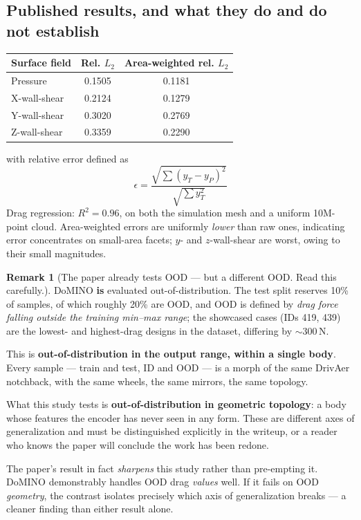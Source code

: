 \documentclass[10pt,a4paper]{article}
\theoremstyle{definition}
\newtheorem{remark}{Remark}[section]
\begin{document}
\subsection{Published results, and what they do and do not establish}
\label{sec:published}

\begin{center}\small
\begin{tabular}{@{}lcc@{}}
\toprule
\textbf{Surface field} & \textbf{Rel. $L_2$} & \textbf{Area-weighted rel. $L_2$} \\
\midrule
Pressure       & 0.1505 & 0.1181 \\
X-wall-shear   & 0.2124 & 0.1279 \\
Y-wall-shear   & 0.3020 & 0.2769 \\
Z-wall-shear   & 0.3359 & 0.2290 \\
\bottomrule
\end{tabular}
\end{center}

with relative error defined as
\begin{equation}
\epsilon = \frac{\sqrt{\sum \left(y_T - y_P\right)^2}}{\sqrt{\sum y_T^2}}
\label{eq:relerr}
\end{equation}
Drag regression: $R^2 = 0.96$, on both the simulation mesh and a uniform 10M-point
cloud. Area-weighted errors are uniformly \emph{lower} than raw ones, indicating
error concentrates on small-area facets; $y$- and $z$-wall-shear are worst, owing to
their small magnitudes.

\begin{remark}[The paper already tests OOD --- but a different OOD. Read this carefully.]
\label{rem:ood}
DoMINO \textbf{is} evaluated out-of-distribution. The test split reserves 10\% of
samples, of which roughly 20\% are OOD, and OOD is defined by \emph{drag force falling
outside the training min--max range}; the showcased cases (IDs 419, 439) are the
lowest- and highest-drag designs in the dataset, differing by $\sim$300\,N.

This is \textbf{out-of-distribution in the output range, within a single body}. Every
sample --- train and test, ID and OOD --- is a morph of the same DrivAer notchback, with
the same wheels, the same mirrors, the same topology.

What this study tests is \textbf{out-of-distribution in geometric topology}: a body
whose features the encoder has never seen in any form. These are different axes of
generalization and must be distinguished explicitly in the writeup, or a reader who
knows the paper will conclude the work has been redone.

The paper's result in fact \emph{sharpens} this study rather than pre-empting it.
DoMINO demonstrably handles OOD drag \emph{values} well. If it fails on OOD
\emph{geometry}, the contrast isolates precisely which axis of generalization breaks
--- a cleaner finding than either result alone.
\end{remark}
\end{document}
